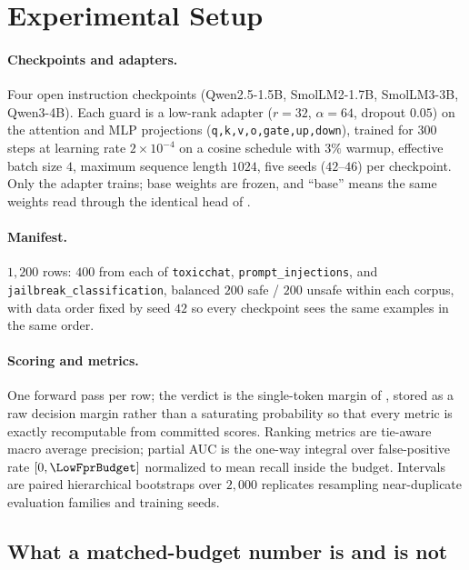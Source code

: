 \documentclass[manuscript,screen,review,anonymous]{acmart}
\newcommand{\code}[1]{\texttt{\small #1}}
\begin{document}
\section{Experimental Setup}
\label{app:methods}

\paragraph{Checkpoints and adapters.}\leavevmode\newline Four open instruction checkpoints (Qwen2.5-1.5B, SmolLM2-1.7B,
SmolLM3-3B, Qwen3-4B). Each guard is a low-rank adapter \citep{hu2021lora} ($r{=}32$, $\alpha{=}64$,
dropout $0.05$) on the attention and MLP projections (\code{q,k,v,o,gate,up,down}), trained for $300$
steps at learning rate $2\!\times\!10^{-4}$ on a cosine schedule with $3\%$ warmup, effective batch
size $4$, maximum sequence length $1024$, five seeds ($42$--$46$) per checkpoint. Only the adapter
trains; base weights are frozen, and ``base'' means the same weights read through the identical head
of .

\paragraph{Manifest.} $1{,}200$ rows: $400$ from each of \code{toxicchat},
\code{prompt\_injections}, and \code{jailbreak\_classification}, balanced $200$ safe / $200$ unsafe
within each corpus, with data order fixed by seed $42$ so every checkpoint sees the same examples in
the same order.

\paragraph{Scoring and metrics.} One forward pass per row; the verdict is the single-token margin of
, stored as a raw decision margin rather than a saturating probability so that every
metric is exactly recomputable from committed scores. Ranking metrics are tie-aware macro average
precision; partial AUC is the one-way integral over false-positive rate $[0,\LowFprBudget]$
normalized to mean recall inside the budget. Intervals are paired hierarchical bootstraps over
$2{,}000$ replicates resampling near-duplicate evaluation families and training seeds.

\subsection{What a matched-budget number is and is not}
\label{sec:matched-fpr-limits}
\end{document}
